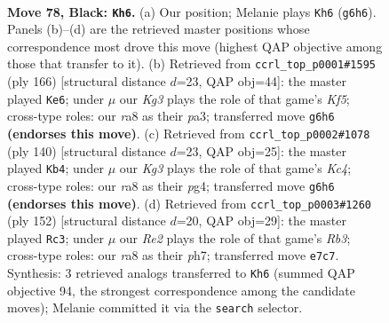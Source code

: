 \documentclass[11pt]{article}
\begin{document}
\clearpage

\begin{figure}[p]\centering
\begin{subfigure}{0.46\textwidth}\centering
\resizebox{\linewidth}{!}{%
\newchessgame
\chessboard[
  setfen={R7/4rp2/2R1p1k1/8/P3P2K/5P2/8/8 b - - 48 78},
  showmover=false,
  pgfstyle=straightmove, color=movearrow, markmove={g6-h6}
]}
\caption{}
\end{subfigure}\hfill
\begin{subfigure}{0.46\textwidth}\centering
\resizebox{\linewidth}{!}{%
\newchessgame
\chessboard[
  setfen={8/6k1/3p4/1r1P1K2/4PR2/p7/8/8 w - - 0 84},
  showmover=false,
  pgfstyle=straightmove, color=movearrow, markmove={f5-e6}
]}
\caption{}
\end{subfigure}
\\[4pt]
\begin{subfigure}{0.46\textwidth}\centering
\resizebox{\linewidth}{!}{%
\newchessgame
\chessboard[
  setfen={8/8/2k5/r6p/P1K3pP/R5P1/8/8 w - - 53 71},
  showmover=false,
  pgfstyle=straightmove, color=movearrow, markmove={c4-b4}
]}
\caption{}
\end{subfigure}\hfill
\begin{subfigure}{0.46\textwidth}\centering
\resizebox{\linewidth}{!}{%
\newchessgame
\chessboard[
  setfen={8/1r4kp/6p1/P7/1P3P2/1R3K2/2p5/8 w - - 0 77},
  showmover=false,
  pgfstyle=straightmove, color=movearrow, markmove={b3-c3}
]}
\caption{}
\end{subfigure}
\caption{\textbf{Move 78, Black: \texttt{Kh6}.} (a) Our position; Melanie plays \texttt{Kh6} (\texttt{g6h6}). Panels (b)--(d) are the retrieved master positions whose correspondence most drove this move (highest QAP objective among those that transfer to it). (b) Retrieved from \texttt{ccrl\_top\_p0001\#1595} (ply 166) [structural distance $d$=23, QAP obj=44]: the master played \texttt{Ke6}; under $\mu$ our \emph{Kg3} plays the role of that game's \emph{Kf5}; cross-type roles: our \emph{r}a8 as their \emph{p}a3; transferred move \texttt{g6h6} \textbf{(endorses this move)}. (c) Retrieved from \texttt{ccrl\_top\_p0002\#1078} (ply 140) [structural distance $d$=23, QAP obj=25]: the master played \texttt{Kb4}; under $\mu$ our \emph{Kg3} plays the role of that game's \emph{Kc4}; cross-type roles: our \emph{r}a8 as their \emph{p}g4; transferred move \texttt{g6h6} \textbf{(endorses this move)}. (d) Retrieved from \texttt{ccrl\_top\_p0003\#1260} (ply 152) [structural distance $d$=20, QAP obj=29]: the master played \texttt{Rc3}; under $\mu$ our \emph{Re2} plays the role of that game's \emph{Rb3}; cross-type roles: our \emph{r}a8 as their \emph{p}h7; transferred move \texttt{e7c7}. Synthesis: 3 retrieved analogs transferred to \texttt{Kh6} (summed QAP objective 94, the strongest correspondence among the candidate moves); Melanie committed it via the \texttt{search} selector.}
\label{fig:thought-m155}
\end{figure}
\end{document}

